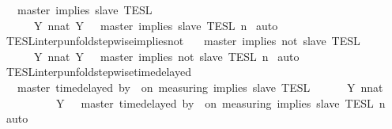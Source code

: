 \begin{isabellebody}
\ \ {\isacartoucheopen}{\isasymlbrakk}\ master\ implies\ slave\ {\isasymrbrakk}\isactrlsub T\isactrlsub E\isactrlsub S\isactrlsub L\isanewline
\ \ \ \ {\isacharequal}\ {\isasymInter}\ {\isacharbraceleft}Y{\isachardot}\ {\isasymexists}n{\isacharcolon}{\isacharcolon}nat{\isachardot}\ Y\ {\isacharequal}\ {\isasymlbrakk}\ master\ implies\ slave\ {\isasymrbrakk}\isactrlsub T\isactrlsub E\isactrlsub S\isactrlsub L\isactrlbsup {\isasymge}\ n\isactrlesup {\isacharbraceright}{\isacartoucheclose}\isanewline
%
\isadelimproof
%
\endisadelimproof
%
\isatagproof
{}\isamarkupfalse%
\ auto%
\endisatagproof
{\isafoldproof}%
%
\isadelimproof
\isanewline
%
\endisadelimproof
\isanewline
{}\isamarkupfalse%
\ TESL{\isacharunderscore}interp{\isacharunderscore}unfold{\isacharunderscore}stepwise{\isacharunderscore}implies{\isacharunderscore}not{\isacharcolon}\isanewline
\ \ {\isacartoucheopen}{\isasymlbrakk}\ master\ implies\ not\ slave\ {\isasymrbrakk}\isactrlsub T\isactrlsub E\isactrlsub S\isactrlsub L\isanewline
\ \ \ \ {\isacharequal}\ {\isasymInter}\ {\isacharbraceleft}Y{\isachardot}\ {\isasymexists}n{\isacharcolon}{\isacharcolon}nat{\isachardot}\ Y\ {\isacharequal}\ {\isasymlbrakk}\ master\ implies\ not\ slave\ {\isasymrbrakk}\isactrlsub T\isactrlsub E\isactrlsub S\isactrlsub L\isactrlbsup {\isasymge}\ n\isactrlesup {\isacharbraceright}{\isacartoucheclose}\isanewline
%
\isadelimproof
%
\endisadelimproof
%
\isatagproof
{}\isamarkupfalse%
\ auto%
\endisatagproof
{\isafoldproof}%
%
\isadelimproof
\isanewline
%
\endisadelimproof
\isanewline
{}\isamarkupfalse%
\ TESL{\isacharunderscore}interp{\isacharunderscore}unfold{\isacharunderscore}stepwise{\isacharunderscore}timedelayed{\isacharcolon}\isanewline
\ \ {\isacartoucheopen}{\isasymlbrakk}\ master\ time{\isacharminus}delayed\ by\ {\isasymdelta}{\isasymtau}\ on\ measuring\ implies\ slave\ {\isasymrbrakk}\isactrlsub T\isactrlsub E\isactrlsub S\isactrlsub L\isanewline
\ \ \ \ {\isacharequal}\ {\isasymInter}\ {\isacharbraceleft}Y{\isachardot}\ {\isasymexists}n{\isacharcolon}{\isacharcolon}nat{\isachardot}\isanewline
\ \ \ \ \ \ \ \ \ \ Y\ {\isacharequal}\ {\isasymlbrakk}\ master\ time{\isacharminus}delayed\ by\ {\isasymdelta}{\isasymtau}\ on\ measuring\ implies\ slave\ {\isasymrbrakk}\isactrlsub T\isactrlsub E\isactrlsub S\isactrlsub L\isactrlbsup {\isasymge}\ n\isactrlesup {\isacharbraceright}{\isacartoucheclose}\isanewline
%
\isadelimproof
%
\endisadelimproof
%
\isatagproof
{}\isamarkupfalse%
\ auto%
\endisatagproof
{\isafoldproof}%
%
\isadelimproof
\isanewline

\end{isabellebody}
